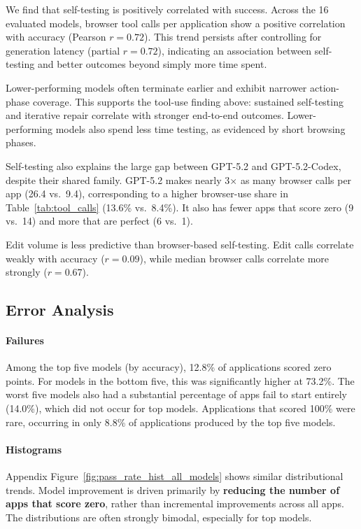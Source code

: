 We find that self-testing is positively correlated with success. Across the 16 evaluated models, browser tool calls per application show a positive correlation with accuracy (Pearson $r=0.72$). This trend persists after controlling for generation latency (partial $r=0.72$), indicating an association between self-testing and better outcomes beyond simply more time spent.

Lower-performing models often terminate earlier and exhibit narrower action-phase coverage. This supports the tool-use finding above: sustained self-testing and iterative repair correlate with stronger end-to-end outcomes. Lower-performing models also spend less time testing, as evidenced by short browsing phases.

Self-testing also explains the large gap between GPT-5.2 and GPT-5.2-Codex, despite their shared family. GPT-5.2 makes nearly 3$\times$ as many browser calls per app (26.4 vs.\ 9.4), corresponding to a higher browser-use share in Table~\ref{tab:tool_calls} (13.6\% vs.\ 8.4\%). It also has fewer apps that score zero (9 vs.\ 14) and more that are perfect (6 vs.\ 1).

Edit volume is less predictive than browser-based self-testing. Edit calls correlate weakly with accuracy ($r=0.09$), while median browser calls correlate more strongly ($r=0.67$).

\subsection{Error Analysis}

\paragraph{Failures} Among the top five models (by accuracy), 12.8\% of applications scored zero points. For models in the bottom five, this was significantly higher at 73.2\%. The worst five models also had a substantial percentage of apps fail to start entirely (14.0\%), which did not occur for top models. Applications that scored 100\% were rare, occurring in only 8.8\% of applications produced by the top five models.

\paragraph{Histograms} Appendix Figure~\ref{fig:pass_rate_hist_all_models} shows similar distributional trends. Model improvement is driven primarily by \textbf{reducing the number of apps that score zero}, rather than incremental improvements across all apps. The distributions are often strongly bimodal, especially for top models.

